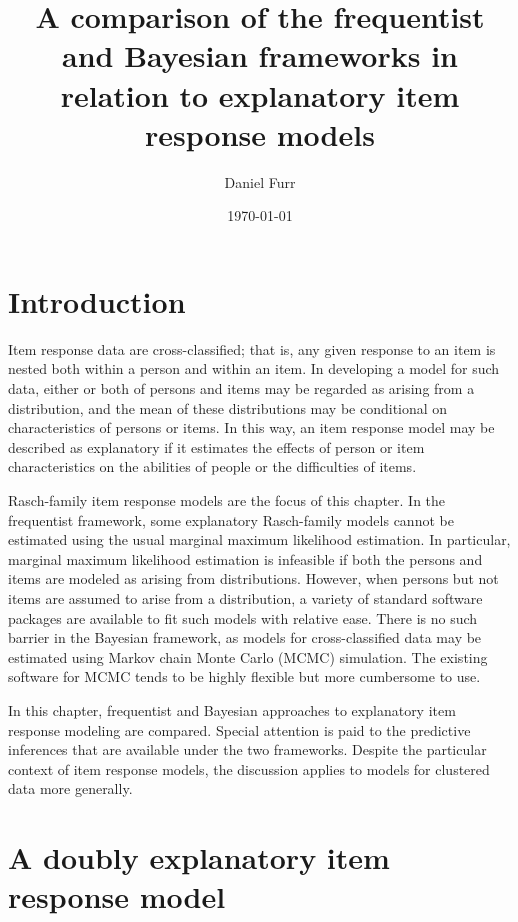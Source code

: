 \documentclass[12pt, letterpaper]{article}
\title{A comparison of the frequentist and Bayesian frameworks in relation to explanatory item response models}
\author{Daniel Furr}
\date{\today}
\begin{document}


\maketitle

\newcommand{\iiiiint}{\int \!\!\! \int \!\!\! \int \!\!\! \int \!\!\! \int}
\newcommand{\iiiiiint}{\int \!\!\! \int \!\!\! \int \!\!\! \int \!\!\! \int \!\!\! \int}


\section{Introduction}

Item response data are cross-classified; that is, any given response to an item is nested both within a person and within an item.
In developing a model for such data, either or both of persons and items may be regarded as arising from a distribution, and the mean of these distributions may be conditional on characteristics of persons or items.
In this way, an item response model may be described as explanatory if it estimates the effects of person or item characteristics on the abilities of people or the difficulties of items.

Rasch-family item response models are the focus of this chapter. In the frequentist framework, some explanatory Rasch-family models cannot be estimated using the usual marginal maximum likelihood estimation.
In particular, marginal maximum likelihood estimation is infeasible if both the persons and items are modeled as arising from distributions.
However, when persons but not items are assumed to arise from a distribution, a variety of standard software packages are available to fit such models with relative ease.
There is no such barrier in the Bayesian framework, as models for cross-classified data may be estimated using Markov chain Monte Carlo (MCMC) simulation. The existing software for MCMC tends to be highly flexible but more cumbersome to use.

In this chapter, frequentist and Bayesian approaches to explanatory item response modeling are compared.
Special attention is paid to the predictive inferences that are available under the two frameworks.
Despite the particular context of item response models, the discussion applies to models for clustered data more generally.


\section{A doubly explanatory item response model}
\end{document}
